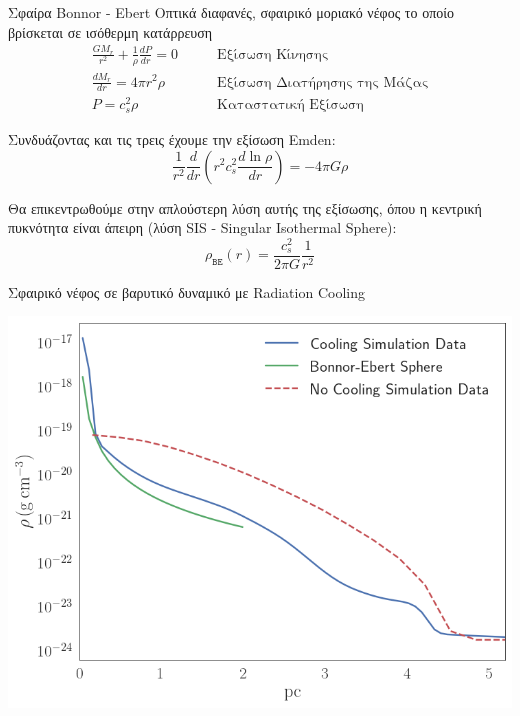 \documentclass{beamer}
\begin{document}
\begin{frame}{Σφαίρα Bonnor - Ebert}%
	Οπτικά διαφανές, σφαιρικό μοριακό νέφος το οποίο βρίσκεται σε ισόθερμη κατάρρευση	
	\begin{align}
	\frac{GM_r}{r^2} +\frac{1}{\rho}\frac{dP}{dr}=0  &\qquad \text{Εξίσωση Κίνησης}\\
	\frac{dM_r}{dr} = 4 \pi r^2 \rho &\qquad \text{Εξίσωση Διατήρησης της Μάζας}\\
	P = c_s ^2 \rho &\qquad \text{Καταστατική Εξίσωση}
	\end{align}
	
	Συνδυάζοντας και τις τρεις έχουμε την εξίσωση Emden:
	\begin{equation}
	\frac{1}{r^2}\frac{d}{dr} \left( r^2 c_s ^2 \frac{d \ln \rho}{dr}\right)  = -4 \pi G \rho
	\end{equation}
	
	Θα επικεντρωθούμε στην απλούστερη λύση αυτής της εξίσωσης, όπου η κεντρική πυκνότητα είναι άπειρη (λύση SIS - Singular Isothermal Sphere):
	\begin{equation}
	\label{eq:B-E_density}
	\rho _\mathtt{BE}(r) =\frac{c_s ^2}{2 \pi G} \frac{1}{r^2}
	\end{equation}
	
\end{frame}	

\begin{frame}{Σφαιρικό νέφος σε βαρυτικό δυναμικό με Radiation Cooling}
	
\begin{center}
	\includegraphics[width=0.8\linewidth]{../Document/DataImages/H2CoolGRHOprofile-BE}
\end{center}
\end{frame}	
	
\end{document}

